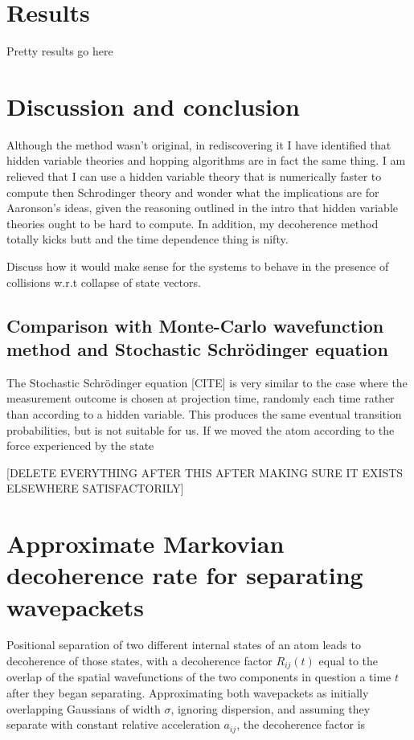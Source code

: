 \section{Results}\label{sec:HVSC_results}
Pretty results go here

\section{Discussion and conclusion}\label{sec:HVSC_discussion}

Although the method wasn't original, in rediscovering it I have identified that hidden variable theories and hopping algorithms are in fact the same thing. I am relieved that I can use a hidden variable theory that is numerically faster to compute then Schrodinger theory and wonder what the implications are for Aaronson's ideas, given the reasoning outlined in the intro that hidden variable theories ought to be hard to compute. In addition, my decoherence method totally kicks butt and the time dependence thing is nifty.

Discuss how it would make sense for the systems to behave in the presence of collisions w.r.t collapse of state vectors.

\subsection{Comparison with Monte-Carlo wavefunction method and Stochastic Schr\"odinger equation} 
The Stochastic Schr\"odinger equation [CITE] is very similar to the case where the measurement outcome is chosen at projection time, randomly each time rather than according to a hidden variable. This produces the same eventual transition probabilities, but is not suitable for us. If we moved the atom according to the force experienced by the state


[DELETE EVERYTHING AFTER THIS AFTER MAKING SURE IT EXISTS ELSEWHERE SATISFACTORILY]

\section{Approximate Markovian decoherence rate for separating wavepackets}

Positional separation of two different internal states of an atom leads to decoherence of those states, with a decoherence factor $R_{ij}(t)$ equal to the overlap of the spatial wavefunctions of the two components in question a time $t$ after they began separating. Approximating both wavepackets as initially overlapping Gaussians of width $\sigma$, ignoring dispersion, and assuming they separate with constant relative acceleration $a_{ij}$, the decoherence factor is

